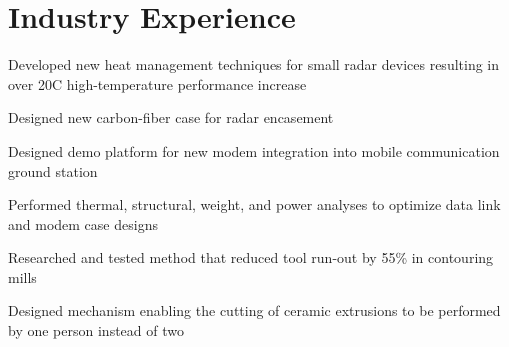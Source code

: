 \documentclass[letterpaper]{deedy-resume} %
\begin{document}
\begin{minipage}[t]{0.62\textwidth}

\section{Industry Experience}


\vspace{\topsep} %
\begin{tightitemize}
\item Developed new heat management techniques for small radar devices resulting in over 20\degree C
high-temperature performance increase
\item Designed new carbon-fiber case for radar encasement
\end{tightitemize}

\sectionspace %



\begin{tightitemize}
\item Designed demo platform for new modem integration into mobile communication
ground station
\item Performed thermal, structural, weight, and power analyses to optimize
  data link and modem case designs
\end{tightitemize}

\sectionspace %



\begin{tightitemize}
\item  Researched and tested method that reduced tool run-out by 55\% in
  contouring mills
\item Designed mechanism enabling the cutting of ceramic extrusions to be
  performed by one person instead of two
\end{tightitemize}

\sectionspace %





\end{minipage} %
\end{document}
